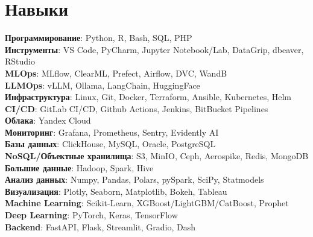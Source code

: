 \section{Навыки}
\begin{itemize}[leftmargin=0.15in, label={}]
  {\item{
        \textbf{Программирование}{: Python, R, Bash, SQL, PHP} \\
        \textbf{Инструменты}{: VS Code, PyCharm, Jupyter Notebook/Lab, DataGrip, dbeaver, RStudio} \\
        \textbf{MLOps}{: MLflow, ClearML, Prefect, Airflow, DVC, WandB} \\
        \textbf{LLMOps}{: vLLM, Ollama, LangChain, HuggingFace} \\
        \textbf{Инфраструктура}{: Linux, Git, Docker, Terraform, Ansible, Kubernetes, Helm} \\
        \textbf{CI/CD}{: GitLab CI/CD, Github Actions, Jenkins, BitBucket Pipelines} \\
        \textbf{Облака}{: Yandex Cloud} \\
        \textbf{Мониторинг}{: Grafana, Prometheus, Sentry, Evidently AI} \\
        \textbf{Базы данных}{: ClickHouse, MySQL, Oracle, PostgreSQL} \\
        \textbf{NoSQL/Объектные хранилища}{: S3, MinIO, Ceph, Aerospike, Redis, MongoDB} \\
        \textbf{Большие данные}{: Hadoop, Spark, Hive} \\
        \textbf{Анализ данных}{: Numpy, Pandas, Polars, pySpark, SciPy, Statmodels} \\
        \textbf{Визуализация}{: Plotly, Seaborn, Matplotlib, Bokeh, Tableau} \\
        \textbf{Machine Learning}{: Scikit-Learn, XGBoost/LightGBM/CatBoost, Prophet} \\
        \textbf{Deep Learning}{: PyTorch, Keras, TensorFlow} \\
        \textbf{Backend}{: FastAPI, Flask, Streamlit, Gradio, Dash} \\
        }}
\end{itemize}